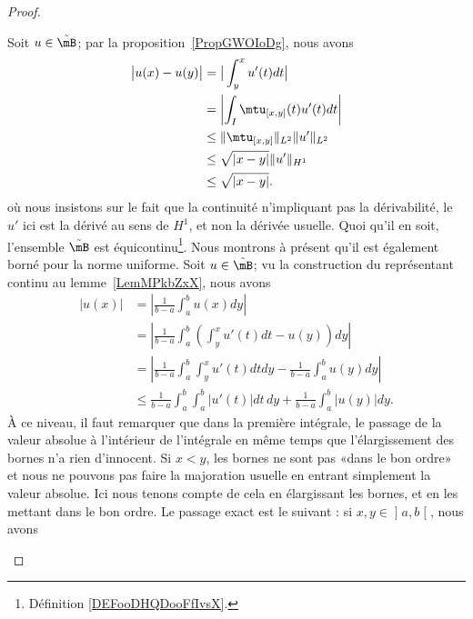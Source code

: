\begin{proof}
\begin{enumerate}
		      Soit \( u\in \tilde \mB\); par la proposition~\ref{PropGWOIoDg}, nous avons
		      \begin{subequations}
			      \begin{align}
				      \big| u(x)-u(y) \big| & =\big| \int_y^xu'(t)dt \big|                                      \\
				                            & =\left| \int_I\mtu_{[x,y]}(t)u'(t)dt \right|                      \\
				                            & \leq\| \mtu_{\mathopen[ x , y \mathclose]} \|_{L^2}\| u' \|_{L^2} \\
				                            & \leq\sqrt{| x-y |}\| u' \|_{H^1}                                  \\
				                            & \leq\sqrt{| x-y |}.
			      \end{align}
		      \end{subequations}
		      où nous insistons sur le fait que la continuité n'impliquant pas la dérivabilité, le \( u'\) ici est la dérivé au sens de \( H^1\), et non la dérivée usuelle. Quoi qu'il en soit, l'ensemble \(\tilde  \mB\) est équicontinu\footnote{Définition \ref{DEFooDHQDooFfIvsX}.}. Nous montrons à présent qu'il est également borné pour la norme uniforme. Soit \( u\in\tilde \mB\); vu la construction du représentant continu au lemme~\ref{LemMPkbZxX}, nous avons
		      \begin{subequations}
			      \begin{align}
				      \big| u(x) \big| & =\left| \frac{1}{ b-a }\int_a^bu(x)dy \right|                                                           \\
				                       & =\left| \frac{1}{ b-a }\int_a^b\left( \int_y^xu'(t)dt-u(y) \right)dy \right|                            \\
				                       & =\left| \frac{1}{ b-a }\int_a^b\int_y^xu'(t)dtdy-\frac{1}{ b-a }\int_a^b u(y)dy \right|                 \\
				                       & \leq\frac{1}{ b-a }\int_a^b\int_a^b| u'(t) |dt\,dy+\frac{1}{ b-a }\int_a^b| u(y) |dy \label{EqCFwSOxh}.
			      \end{align}
		      \end{subequations}
		      À ce niveau, il faut remarquer que dans la première intégrale, le passage de la valeur absolue à l'intérieur de l'intégrale en même temps que l'élargissement des bornes n'a rien d'innocent. Si \( x<y\), les bornes ne sont pas «dans le bon ordre» et nous ne pouvons pas faire la majoration usuelle en entrant simplement la valeur absolue. Ici nous tenons compte de cela en élargissant les bornes, et en les mettant dans le bon ordre. Le passage exact est le suivant : si \( x,y\in\mathopen] a , b \mathclose[\), nous avons

\end{enumerate}
\end{proof}

